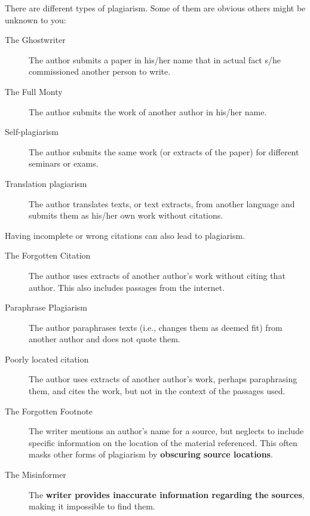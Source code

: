 There are different types of plagiarism. Some of them are obvious others might be unknown to you:
\begin{description}
	\item[The Ghostwriter] The author submits a paper in his/her name that in actual fact s/he commissioned another
person to write.
	\item[The Full Monty] The author submits the work of another author in his/her name.
	\item[Self-plagiarism] The author submits the same work (or extracts of the paper) for different seminars or exams.
	\item[Translation plagiarism] The author translates texts, or text extracts, from another language and submits them as his/her own work without citations.
\end{description}

Having incomplete or wrong citations can also lead to plagiarism.
\begin{description}
	\item[The Forgotten Citation] The author uses extracts of another author's work without citing that author. This also includes passages from the internet.
	\item[Paraphrase Plagiarism] The author paraphrases texts (i.e., changes them as deemed fit) from another author and does not quote them.
	\item[Poorly located citation] The author uses extracts of another author's work, perhaps paraphrasing them, and cites the work, but not in the context of the passages used.
	\item[The Forgotten Footnote] The writer mentions an author's name for a source, but neglects to include specific information on the location of the material referenced. This often masks other forms of plagiarism by \textbf{obscuring source locations}.
	\item[The Misinformer] The \textbf{writer provides inaccurate information regarding the sources}, making it impossible to find them.
\end{description}

